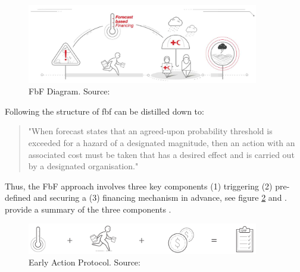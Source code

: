 \begin{figure}[!htp]
    \centering
    \includegraphics[width=0.9\textwidth]{figures/2023_MA_th_fbf_diagram.jpg}
    \decoRule
    \caption[FbF Diagram]{FbF Diagram. Source: \textcite{rcrcFORECASTBASEDFINANCINGEARLY2020}}
    \label{fig:th_fbf_diagram}
\end{figure}

Following \autocite{coughlandeperezForecastbasedFinancingApproach2015, coughlandeperezActionbasedFloodForecasting2016} the structure of \acrshort{fbf} can be distilled down to:
\begin{quote}
    "When forecast states that an agreed-upon probability threshold is exceeded for a hazard of a designated magnitude, then an action with an associated cost must be taken that has a desired effect and is carried out by a designated organisation." \autocite[2]{coughlandeperezActionbasedFloodForecasting2016}
\end{quote}

Thus, the FbF approach involves three key components (1) triggering (2) pre-defined  and securing a (3) financing mechanism in advance, see figure \ref{fig:th_eap_stages} and \textcite{ifrcForecastbasedFinancingNew2019}.  provide a summary of the three components \autocite{ruthForecastbasedFinancingPolicy2017}.

\begin{figure}[!htp]
    \centering
    \includegraphics[width=0.9\textwidth]{figures/2023_MA_th_eap.pdf}
    \decoRule
    \caption[Early Action Protocol]{Early Action Protocol. Source: \textcite{ifrcForecastbasedFinancingNew2019}}
    \label{fig:th_eap_stages}
\end{figure}


